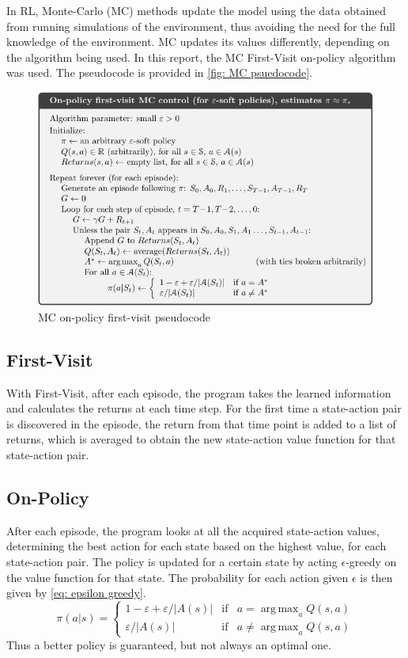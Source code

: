 \documentclass{class}
\DeclareMathOperator*{\argmax}{arg\,max}
\begin{document}
\label{sec: monte-carlo}
In RL, Monte-Carlo (MC) methods update the model using the data obtained from running simulations of the environment, thus avoiding the need for the full knowledge of the environment. MC updates its values differently, depending on the algorithm being used. In this report, the MC First-Visit on-policy algorithm was used. The pseudocode is provided in \autoref{fig: MC psuedocode}.
\begin{figure}[H]
    \centering
    \includegraphics[width=0.5\linewidth]{images/mc_on_policy_first_visit.png}
    \caption{MC on-policy first-visit pseudocode \parencite[p. 101]{sutton-2018}}
    \label{fig: MC psuedocode}
\end{figure}

\subsection{First-Visit}
With First-Visit, after each episode, the program takes the learned information and calculates the returns at each time step. For the first time a state-action pair is discovered in the episode, the return from that time point is added to a list of returns, which is averaged to obtain the new state-action value function for that state-action pair.

\subsection{On-Policy}
After each episode, the program looks at all the acquired state-action values, determining the best action for each state based on the highest value, for each state-action pair. The policy is updated for a certain state by acting $\epsilon$-greedy on the value function for that state. The probability for each action given $\epsilon$ is then given by \autoref{eq: epsilon greedy}.
\begin{equation}
\label{eq: epsilon greedy}
    \pi (a|s)=\left\{ \begin{array}{rcl}
         1-\varepsilon+\varepsilon/|A(s)|& \mbox{if}& a = \argmax_a Q(s,a)  \\ \varepsilon/|A(s)|
         & \mbox{if} & a \neq \argmax_a Q(s,a)
    \end{array} \right.
\end{equation}
Thus a better policy is guaranteed, but not always an optimal one.
\end{document}
